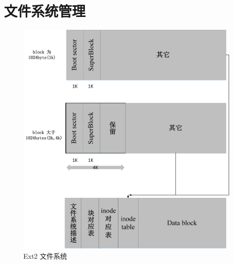 \section{文件系统管理}

\setcounter{figure}{0}

\begin{figure}[h]
\centering
\includegraphics[width=\textwidth]{pic/fileSystem.jpg}
\caption{Ext2 文件系统}
\end{figure}

